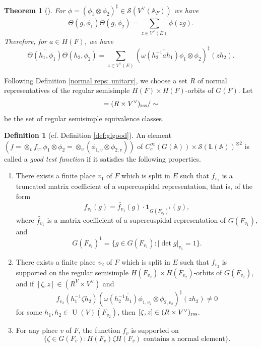 \documentclass[11pt, reqno]{amsart}
\numberwithin{equation}{subsection}
\theoremstyle{plain}
\newtheorem{theorem}[proposition]{Theorem}
\theoremstyle{definition}
\newtheorem{definition}[proposition]{Definition}
\newcommand{\BA}{\mathbb A}
\newcommand{\CS}{\mathcal{S}}
\newcommand{\ol}{\overline}
\DeclareMathOperator{\U}{U}
\newcommand{\rss}{\textnormal{rss}}
\begin{document}
\begin{theorem}[{\cite[Lemma~4.2.1]{Xue-GGP}}]  \label{key:reduction} For $\phi=(\phi_1 \otimes \phi_2)^\ddagger \in \CS(V^\vee(\BA_F))$ we have
\begin{equation}
\overline{ \Theta(g, \phi_1) }  \Theta(g, \phi_2) = \sum_{z \in V^\vee(E)} \phi(zg).
\end{equation}
Therefore, for $a \in H(F)$, we have 
\[
\overline{\Theta(h_1, \phi_1)}  \Theta(h_2, \phi_2)  = \sum_{z \in V^\vee(E)} ( \overline{ \omega(h_2^{-1}ah_1) \phi_1} \otimes  \phi_2)^\ddagger (zh_2).
\]
\end{theorem}

Following Definition \ref{normal reps: unitary}, we choose a set $R$ of normal representatives of
the regular semisimple $H(F) \times H(F)$-orbits
of $G(F)$. Let 
\begin{equation}
[Y_\rss]=(R \times V^\vee)_{\rss} / \sim
\end{equation}
be the set of regular semisimple equivalence classes.


\begin{definition}[cf. Definition \ref{def:glgood}]
\label{def:ugood} 
An element $(f = \otimes_{v} f_v, \phi_1 \otimes \phi_2 = \otimes_{v}  (\phi_{1,v} \otimes \phi_{2,v} ))$ of $C_c^\infty(G(\mathbb A)) \times \CS(\mathbb L(\mathbb A))^{\otimes 2}$ is called a
\emph{good test function} if it satisfies the following
properties.
\begin{enumerate}[(1)]
\item  \label{umatrixcoeff}
There exists a finite place $v_1$ of
$F$ which is split in $E$ such that $f_{v_1}$ is a truncated matrix coefficient of a supercuspidal representation, that is, of
the form
\[
    f_{v_1}(g) = \widetilde{f_{v_1}}(g) 
    \cdot \mathbf{1}_{G(F_{v_1})^1}(g),
\]
where $\widetilde{f_{v_1}}$ is a matrix coefficient of
a supercuspidal representation of $G(F_{v_1})$, and
\[
    G(F_{v_1})^1 = \{g \in G(F_{v_1}) : 
    \lvert \det g \rvert_{v_1} =  1  \}.
\]

\item \label{ursssupp} 
There exists a finite place $v_2$ of $F$
which is split in $E$ such that
$f_{v_2}$ is supported on the regular
semisimple $H(F_{v_2}) \times H(F_{v_2})$-orbits 
of $G(F_{v_2})$, and if $[\zeta, z] \in (R^V\times V^\vee)$ and
\[
    f_{v_2}(h_1^{-1}\zeta h_2)
    (\ol{\omega
    (h_2^{-1}h_1)\phi_{1,v_2}} \otimes 
    \phi_{2,v_2})^\ddagger(zh_2)\neq 0
\]
for some $h_1, h_2 \in \U(V)(F_{v_2})$,
then $[\zeta, z] \in (R \times V^\vee)_{\rss}$.

\item For any place $v$ of $F$,
the function $f_v$ is supported on
\[
    \{\zeta \in G(F_v) : H(F_v) \zeta H(F_v)
    \text{ contains a normal element}\}.
\]
\end{enumerate}
\end{definition}
\end{document}
